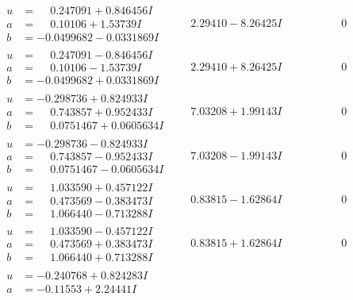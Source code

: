 \documentclass[1p]{elsarticle_modified}
\theoremstyle{definition}
\begin{document}
$$\begin{array}{c|c|c}
\begin{aligned}
u &= \phantom{-}0.247091 + 0.846456 I \\
a &= \phantom{-}0.10106 + 1.53739 I \\
b &= -0.0499682 - 0.0331869 I\end{aligned}
 & \phantom{-}2.29410 - 8.26425 I & \phantom{-0.000000 } 0 \\ \hline\begin{aligned}
u &= \phantom{-}0.247091 - 0.846456 I \\
a &= \phantom{-}0.10106 - 1.53739 I \\
b &= -0.0499682 + 0.0331869 I\end{aligned}
 & \phantom{-}2.29410 + 8.26425 I & \phantom{-0.000000 } 0 \\ \hline\begin{aligned}
u &= -0.298736 + 0.824933 I \\
a &= \phantom{-}0.743857 + 0.952433 I \\
b &= \phantom{-}0.0751467 + 0.0605634 I\end{aligned}
 & \phantom{-}7.03208 + 1.99143 I & \phantom{-0.000000 } 0 \\ \hline\begin{aligned}
u &= -0.298736 - 0.824933 I \\
a &= \phantom{-}0.743857 - 0.952433 I \\
b &= \phantom{-}0.0751467 - 0.0605634 I\end{aligned}
 & \phantom{-}7.03208 - 1.99143 I & \phantom{-0.000000 } 0 \\ \hline\begin{aligned}
u &= \phantom{-}1.033590 + 0.457122 I \\
a &= \phantom{-}0.473569 - 0.383473 I \\
b &= \phantom{-}1.066440 - 0.713288 I\end{aligned}
 & \phantom{-}0.83815 - 1.62864 I & \phantom{-0.000000 } 0 \\ \hline\begin{aligned}
u &= \phantom{-}1.033590 - 0.457122 I \\
a &= \phantom{-}0.473569 + 0.383473 I \\
b &= \phantom{-}1.066440 + 0.713288 I\end{aligned}
 & \phantom{-}0.83815 + 1.62864 I & \phantom{-0.000000 } 0 \\ \hline\begin{aligned}
u &= -0.240768 + 0.824283 I \\
a &= -0.11553 + 2.24441 I \\

\end{aligned}
\end{array}$$
\end{document}
